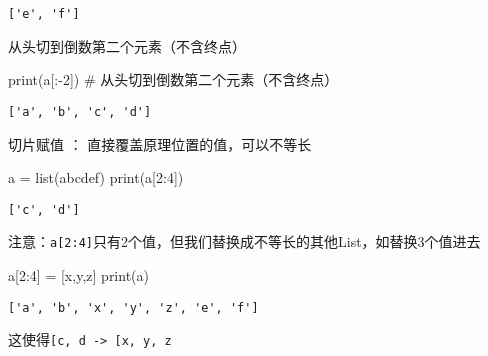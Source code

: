 \documentclass[
  letterpaper,
  DIV=11,
  numbers=noendperiod]{scrreprt}
\newenvironment{Shaded}{\begin{snugshade}}{\end{snugshade}}
\newcommand{\BuiltInTok}[1]{\textcolor[rgb]{0.00,0.23,0.31}{#1}}
\newcommand{\CommentTok}[1]{\textcolor[rgb]{0.37,0.37,0.37}{#1}}
\newcommand{\DecValTok}[1]{\textcolor[rgb]{0.68,0.00,0.00}{#1}}
\newcommand{\NormalTok}[1]{\textcolor[rgb]{0.00,0.23,0.31}{#1}}
\newcommand{\OperatorTok}[1]{\textcolor[rgb]{0.37,0.37,0.37}{#1}}
\newcommand{\StringTok}[1]{\textcolor[rgb]{0.13,0.47,0.30}{#1}}
\begin{document}
\begin{verbatim}
['e', 'f']
\end{verbatim}

从头切到倒数第二个元素（不含终点）

\begin{Shaded}
\begin{Highlighting}[]
\BuiltInTok{print}\NormalTok{(a[:}\OperatorTok{{-}}\DecValTok{2}\NormalTok{]) }\CommentTok{\# 从头切到倒数第二个元素（不含终点）}
\end{Highlighting}
\end{Shaded}

\begin{verbatim}
['a', 'b', 'c', 'd']
\end{verbatim}

切片赋值 ： 直接覆盖原理位置的值，可以不等长

\begin{Shaded}
\begin{Highlighting}[]
\NormalTok{a }\OperatorTok{=} \BuiltInTok{list}\NormalTok{(}\StringTok{\textquotesingle{}abcdef\textquotesingle{}}\NormalTok{)}
\BuiltInTok{print}\NormalTok{(a[}\DecValTok{2}\NormalTok{:}\DecValTok{4}\NormalTok{])}
\end{Highlighting}
\end{Shaded}

\begin{verbatim}
['c', 'd']
\end{verbatim}

注意：\texttt{a{[}2:4{]}}只有2个值，但我们替换成不等长的其他List，如替换3个值进去

\begin{Shaded}
\begin{Highlighting}[]
\NormalTok{a[}\DecValTok{2}\NormalTok{:}\DecValTok{4}\NormalTok{] }\OperatorTok{=}\NormalTok{ [}\StringTok{\textquotesingle{}x\textquotesingle{}}\NormalTok{,}\StringTok{\textquotesingle{}y\textquotesingle{}}\NormalTok{,}\StringTok{\textquotesingle{}z\textquotesingle{}}\NormalTok{]}
\BuiltInTok{print}\NormalTok{(a)}
\end{Highlighting}
\end{Shaded}

\begin{verbatim}
['a', 'b', 'x', 'y', 'z', 'e', 'f']
\end{verbatim}

这使得\texttt{{[}\textquotesingle{}c\textquotesingle{},\ \textquotesingle{}d\textquotesingle{}{]}\ -\textgreater{}\ {[}\textquotesingle{}x\textquotesingle{},\ \textquotesingle{}y\textquotesingle{},\ \textquotesingle{}z\textquotesingle{}{]}}
\end{document}
